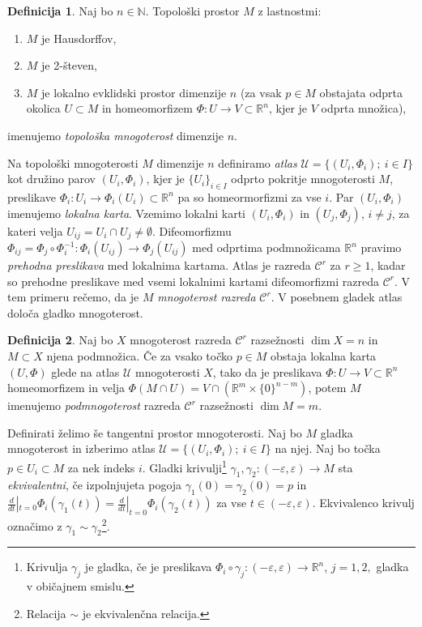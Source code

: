 \documentclass[12pt,a4paper,twoside]{article}
\theoremstyle{definition} %
\newtheorem{definicija}{Definicija}[section]
\theoremstyle{plain} %
\numberwithin{equation}{section}  %
\newcommand{\R}{\mathbb R}
\newcommand{\N}{\mathbb N}
\begin{document}
\begin{definicija}
Naj bo $n \in \N$. Topološki prostor $M$ z lastnostmi:
\begin{enumerate}
\item $M$ je Hausdorffov,
\item $M$ je 2-števen,
\item $M$ je lokalno evklidski prostor dimenzije $n$ (za vsak $p \in M$ obstajata odprta okolica $U \subset M$ in homeomorfizem $\Phi \colon U \to V \subset \R^{n}$, kjer je $V$ odprta množica),
\end{enumerate}
imenujemo \emph{topološka mnogoterost} dimenzije $n$.
\end{definicija}

Na topološki mnogoterosti $M$ dimenzije $n$ definiramo \emph{atlas} $\mathcal{U} = \{ (U_{i}, \Phi_{i}) ; \ i \in I \}$ kot družino parov $(U_{i}, \Phi_{i})$, kjer je $\{ U_{i} \}_{i \in I}$ odprto pokritje mnogoterosti $M$, preslikave $\Phi_{i} \colon U_{i} \to \Phi_{i}(U_{i}) \subset \R^{n}$ pa so homeormorfizmi za vse $i$. Par $(U_{i}, \Phi_{i})$ imenujemo \emph{lokalna karta}.
Vzemimo lokalni karti $(U_{i}, \Phi_{i})$ in $(U_{j}, \Phi_{j})$, $i \neq j$, za kateri velja $U_{ij}=U_{i} \cap U_{j} \neq \emptyset$. Difeomorfizmu $\Phi_{ij} = \Phi_{j} \circ \Phi_{i}^{-1} \colon \Phi_{i}(U_{ij}) \to \Phi_{j}(U_{ij})$ med odprtima podmnožicama $\R^{n}$ pravimo \emph{prehodna preslikava} med lokalnima kartama. Atlas je razreda $\mathcal{C}^{r}$ za $r \geq 1$, kadar so prehodne preslikave med vsemi lokalnimi kartami difeomorfizmi razreda $\mathcal{C}^{r}$. V tem primeru rečemo, da je $M$ \emph{mnogoterost razreda} $\mathcal{C}^{r}$.
V posebnem gladek atlas določa gladko mnogoterost.

\begin{definicija}
Naj bo $X$ mnogoterost razreda $\mathcal{C}^{r}$ razsežnosti $\dim X = n$ in $M \subset X$ njena podmnožica. Če za vsako točko $p \in M$ obstaja lokalna karta $(U, \Phi)$ glede na atlas $\mathcal{U}$ mnogoterosti $X$, tako da je preslikava $\Phi \colon U \to V \subset \mathbb{R}^{n}$ homeomorfizem in velja $\Phi (M \cap U) = V \cap (\mathbb{R}^{m} \times \{0\}^{n-m})$, potem $M$ imenujemo \emph{podmnogoterost} razreda $\mathcal{C}^{r}$ razsežnosti $\dim M = m$.
\end{definicija}

Definirati želimo še tangentni prostor mnogoterosti. Naj bo $M$ gladka mnogoterost in izberimo atlas $\mathcal{U} = \{ (U_{i}, \Phi_{i}) ; \ i \in I \}$ na njej. Naj bo točka $p \in U_{i} \subset M$ za nek indeks $i$.  Gladki krivulji\footnote{Krivulja $\gamma_{j}$ je gladka, če je preslikava $ \Phi_{i} \circ \gamma_{j} \colon (-\varepsilon, \varepsilon) \to \mathbb{R}^{n}$, $j=1,2,$ gladka v običajnem smislu.} 
$\gamma_{1}, \gamma_{2} \colon (-\varepsilon, \varepsilon) \to M$ sta \emph{ekvivalentni}, če izpolnjujeta pogoja
$\gamma_{1}(0) = \gamma_{2}(0) = p$ in $ \frac{d}{dt}|_{t=0} \Phi_{i}(\gamma_{1}(t)) =  \frac{d}{dt}|_{t=0} \Phi_{i}(\gamma_{2}(t))$ za vse $t \in (-\varepsilon, \varepsilon)$. Ekvivalenco krivulj označimo z $\gamma_{1} \sim \gamma_{2}$\footnote{Relacija $\sim$ je ekvivalenčna relacija.}.
\end{document}
